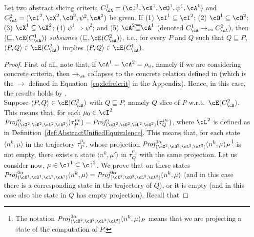 \documentclass[prodmode,acmtocl]{acmsmall}
\newcommand{\caX}{\cX}
\def\prog{\ensuremath{P}\xspace}
\def\progq{\ensuremath{Q}\xspace}
\def\trace{\ensuremath{\tau}\xspace}
\def\memory{\ensuremath{\mu}\xspace}
\def\crit{\ensuremath{C}\xspace}
\def\uco{\ensuremath{\rho}\xspace}
\def\Proj{\ensuremath{\mathit{Proj}}\xspace}
\newcommand{\iid}{\mbox{\sl\tiny id}}
\newcommand{\ra}{\rightarrow}
\newcommand{\Ra}{\Rightarrow}
\def\tuple#1{\langle #1 \rangle}
\newcommand{\0}{\mbox{\bf 0}}
\begin{document}
\begin{lemma}
  \label{the:AbstractUnifiedEquivalenceLemma}
  Let two abstract slicing criteria $\crit_{\cA}^1 =
  (\cI^1,\caX^1,\cO^1,\psi^1,\cA^1)$ and
  $\crit_{\cA}^2=(\cI^2,\caX^2,\cO^2,\psi^2,\cA^2)$ be given.  If (1)
  $\cI^{1}\subseteq \cI^{2}$; (2) $\cO^{1}\subseteq\cO^{2}$; (3)
  $\cX^{1}\subseteq\cX^{2}$; (4) $\psi^1\Ra\psi^2$;
  and (5) $\cA^{2}\overline{\sqsubseteq}\cA^{1}$ (denoted $\crit_\cA^1\ra_{\mbox{\tiny $\cA$}}\crit^2_\cA$), then 
  $(\sqsubseteq,\cE(\crit_{\cA}^1))$ \emph{subsumes} $(\sqsubseteq,\cE(\crit_{\cA}^2))$, i.e., for
  every $\prog$ and $\progq$ such that $\progq\sqsubseteq\prog$, $\tuple{\prog,\progq} \in \cE(\crit_{\cA}^2)$
  implies $\tuple{\prog,\progq} \in \cE(\crit_{\cA}^1)$.
\end{lemma}

\begin{proof}
  First of all, note that, if $\cA^1=\cA^2=\uco_{\iid}$, namely if we
  are considering concrete criteria, then $\ra_{\mbox{\tiny $\cA$}}$
  collapses to the concrete relation defined in \cite{AForm} (which is
  the $\ra$ defined in Equation~\ref{eq:defrelcrit} in the
  Appendix). Hence, in this case, the results holds by
  \cite{AForm}.\\ Suppose $\tuple{\prog,\progq} \in
  \cE(\crit_{\cA}^2)$ with $\progq\sqsubseteq \prog$, namely $\progq$
  slice of $\prog$ w.r.t.\ $\cE(\crit_{\cA}^2)$.  This means that, for
  each $\memory_0\in \cI^2$ $\Proj^{\alpha}_{(\cX^2, \cO^2,
    \cL^2,\cA^2)}(\trace_\prog^{\memory_0}) =
  \Proj^{\alpha}_{(\cX^2,\cO^2,\cL^2,\cA^2)}(\trace_\progq^{\memory_0})$,
  where $\cL^2$ is defined as in
  Definition~\ref{def:AbstractUnifiedEquivalence}.  This means that,
  for each state $\tuple{n^{k},\memory}$ in the trajectory
  $\trace_\prog^{\memory_0}$, whose projection
  $\Proj^{0\alpha}_{(\caX^2, \cO^2, \cL^2, \cA^2)}(n^k,
  \memory)_\prog$\footnote{The notation $\Proj^{0\alpha}_{(\caX^2,
      \cO^2, \cL^2,\cA^2)}(n^k, \memory)_\prog$ means that we are
    projecting a state of the computation of $\prog$.}  is not empty,
  there exists a state $\tuple{n^{k},\memory'}$ in
  $\trace_\progq^{\memory_0}$ with the same projection.  Let us
  consider now, $\memory\in\cI^1\subseteq\cI^2$. We prove that on
  these states $\Proj^{0\alpha}_{(\caX^1, \cO^1, \cL^1, \cA^1)}(n^k,
  \memory)=\Proj^{0\alpha}_{(\caX^2, \cO^2, \cL^2, \cA^2)}(n^k,
  \memory)$ (and in this case there is a corresponding state in the
  trajectory of $\progq$), or it is empty (and in this case also the
  state in $\progq$ has empty projection).  Recall that

\end{proof}
\end{document}

